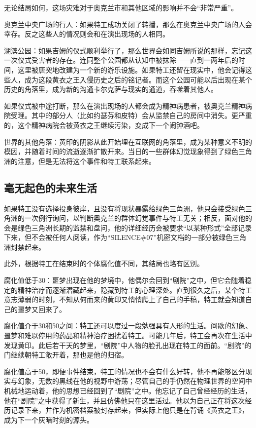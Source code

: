 无论结局如何，这场灾难对于奥克兰市和其他区域的影响并不会“非常严重”。

奥克兰中央广场的行人：如果特工成功关闭了转播，那么在奥克兰中央广场的人会幸存。反之这些人的情况则会和在演出现场的人相同。

湖滨公园：如果吉姆的仪式顺利举行了，那么世界会如同吉姆所说的那样，忘记这一次仪式受害者的存在。连同整个公园都从认知中被抹除——直到一两年后的时间，这里被唐突地改建为一个新的游乐设施。如果特工还留在现实中，他会记得这些人，成为这段黄衣之王入侵历史之后的铭记者。而这个公园可能以后出现在某个历史的角落里，成为新的沟通卡尔克萨与现实的通道，吞噬着其他人。

如果仪式被中途打断，那么在演出现场的人都会成为精神病患者，被奥克兰精神病院受理。其中的部分人（比如约瑟芬和皮特）会从监禁自己的房间中消失。更严重的，这个精神病院会被黄衣之王继续污染，变成下一个闹钟酒吧。

世界的其他角落：黄印的阴影从此开始埋在互联网的角落里，成为某种意义不明的模因，并随着时间的流逝逐渐扩散开来。当日的一些群体幻觉现象得到了绿色三角洲的注意，但是无法将这个事件和特工联系起来。

\subsection{毫无起色的未来生活}

如果特工没有选择投身彼岸，且没有将现状暴露给绿色三角洲，他只会接受绿色三角洲的一次例行询问，以判断奥克兰的群体幻觉事件与特工无关；相反，面对他的会是绿色三角洲长期的监禁和盘问，他的详细经历会被要求“以某种形式”全部记录下来，但不会被任何人阅读，作为“SILENCE\#07”机密文档的一部分被绿色三角洲封禁起来。

此外，根据特工在结束时的个体腐化值不同，其结局也略有区别。

腐化值低于30：噩梦出现在他的梦境中，他偶尔会回到“剧院”之中，但它会随着稳定的精神治疗而逐渐潜藏起来，隐藏到特工的心理深处。直到很久之后，某个特工意志薄弱的时刻，不知从何而来的黄印又悄悄爬上了自己的手稿，特工就会知道自己的噩梦又回来了。

腐化值介于30和50之间：特工还可以度过一段勉强具有人形的生活。间歇的幻象、噩梦和难以停用的药品和精神治疗困扰着特工。可能几年后，特工会再次在生活中发现黄印。此后若干天的梦里，“剧院”中人物的脸孔出现在特工的面前。“剧院”的门继续朝特工敞开着，那也是他的归宿。

腐化值高于50，即便事件结束，特工的情况也不会有什么好转，他不再能够区分现实与幻象，无数的黑线在他的视野中游荡；尽管自己的手仍然在物理世界的空间中机械地运动着，他的思想已经回到了“剧院”之中。他忘记了自己曾经经历的生活，他在“剧院”之中获得了新生，并且仿佛他只在这里活过。他以为自己正在将这次经历记录下来，并作为机密档案被封存起来，但实际上他只是在背诵《黄衣之王》，成为下一个灰暗时刻的源头。

